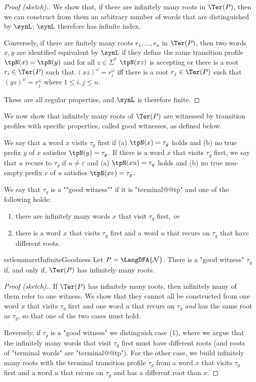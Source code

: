 \documentclass[a4paper,USenglish,cleveref,autoref,thm-restate]{lipics-v2021}
\newcommand{\mc}[1]{\ensuremath{\mathcal{#1}}}
\newcommand{\N}{\mc{N}}
\begin{document}
\begin{proof}[Proof (sketch).]
  We show that, if there are infinitely many roots in $\Ter(P)$, then we can construct from them an arbitrary number of words that are distinguished by $\synL$; $\synL$ therefore has infinite index.

  Conversely, if there are finitely many roots $r_1,\ldots,r_n$ in $\Ter(P)$, then two words $x,y$ are identified equivalent by $\synL$ if they define the same transition profile $\tpN(x) = \tpN(y)$ and for all $z \in \Sigma^*$ $\tpN(xz)$ is accepting
  or there is a root $r_i \in \Ter(P)$ such that $(xz)^{\omega} = r_i^{\omega}$ iff there is a root
  $r_j \in \Ter(P)$ such that $(yz)^{\omega} = r_j^{\omega}$ where $1 \leq i, j \leq n$.

These are all regular properties, and $\synL$ is therefore finite.
\end{proof}

We now show that infinitely many roots of $\Ter(P)$ are witnessed by transition profiles with specific properties, called good witnesses, as defined below.

We say that a word $x$ visits $\tau_g$ first if (a) $\tpN(x)= \tau_g$ holds and (b) no true prefix $y$ of $x$ satisfies $\tpN(y) = \tau_g$.
If there is a word $x$ that visits $\tau_g$ first, we say that $u$ recurs to $\tau_g$ if $u \neq \varepsilon$ and (a) $\tpN(xu)= \tau_g$ holds and (b) no true non-empty prefix $v$ of $u$ satisfies $\tpN(xv) = \tau_g$.

\AP
We say that $\tau_g$ is a ""good witness"" if it is "terminal@@tp" and one of the following holds:
\begin{enumerate}
  \item there are infinitely many words $x$ that visit $\tau_g$ first, \emph{or}
  \item there is a word $x$ that visits $\tau_g$ first and a word $u$ that recurs on $\tau_g$ that have different roots.
\end{enumerate}

\begin{restatable}{rstlemma}{rstInfiniteGoodness}
  \label{lem:InfiniteGoodness}
  Let $P = \LangDFA{\N}$. There is a "good witness" $\tau_g$ if, and only if, $\Ter(P)$ has infinitely many roots.
\end{restatable}

\begin{proof}[Proof (sketch).]
  If $\Ter(P)$ has infinitely many roots, then infinitely many of them refer to one witness. We show that they cannot all be constructed from one word $x$ that visits $\tau_g$ first and one word $u$ that recurs on $\tau_g$ \emph{and} has the same root as $\tau_g$, so that one of the two cases must hold.

  Reversely, if $\tau_g$ is a "good witness" we distinguish case (1), where we argue that the infinitely many words that visit $\tau_g$ first must have different roots (and roots of "terminal words" are "terminal@@tp").
  For the other case, we build infinitely many roots with the terminal transition profile $\tau_g$ from a word $x$ that visits $\tau_g$ first and a word $u$ that recurs on $\tau_g$ and has a different root than $x$.
\end{proof}
\end{document}
